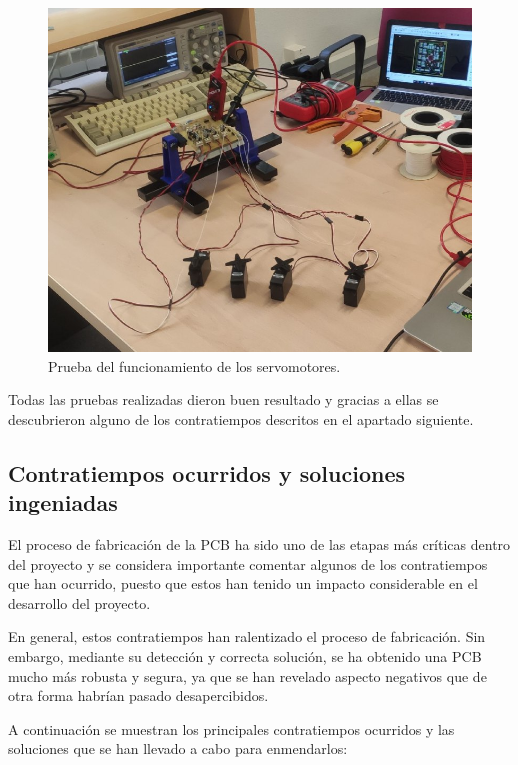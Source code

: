 \begin{itemize}
    \begin{figure}[H]
    \centering 
    \includegraphics[width=0.55\linewidth]{pictures/PruebaServos.jpg}
    \caption{Prueba del funcionamiento de los servomotores.}
    \end{figure}
    
\end{itemize}

Todas las pruebas realizadas dieron buen resultado y gracias a ellas se descubrieron alguno de los contratiempos descritos en el apartado siguiente.

\subsection{Contratiempos ocurridos y soluciones ingeniadas}

El proceso de fabricación de la \ac{PCB} ha sido uno de las etapas más críticas dentro del proyecto y se considera importante comentar algunos de los contratiempos que han ocurrido, puesto que estos han tenido un impacto considerable en el desarrollo del proyecto.

En general, estos contratiempos han ralentizado el proceso de fabricación. Sin embargo, mediante su detección y correcta solución, se ha obtenido una \ac{PCB} mucho más robusta y segura, ya que se han revelado aspecto negativos que de otra forma habrían pasado desapercibidos.

A continuación se muestran los principales contratiempos ocurridos y las soluciones que se han llevado a cabo para enmendarlos:


